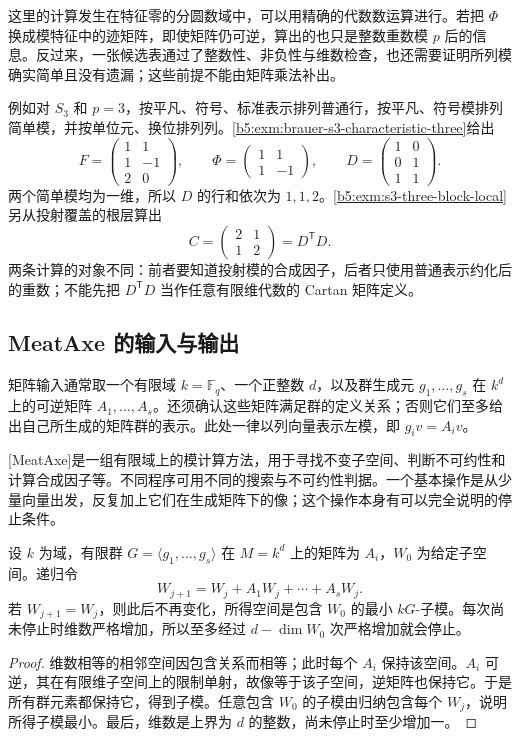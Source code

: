 这里的计算发生在特征零的分圆数域中，可以用精确的代数数运算进行。若把 \(\Phi\) 换成模特征中的迹矩阵，即使矩阵仍可逆，算出的也只是整数重数模 \(p\) 后的信息。反过来，一张候选表通过了整数性、非负性与维数检查，也还需要证明所列模确实简单且没有遗漏；这些前提不能由矩阵乘法补出。

\ProseParagraphBreak
例如对 \(S_3\) 和 \(p=3\)，按平凡、符号、标准表示排列普通行，按平凡、符号模排列简单模，并按单位元、换位排列列。\cref{b5:exm:brauer-s3-characteristic-three}给出
\[
	F=\begin{pmatrix}1&1\\1&-1\\2&0\end{pmatrix},
	\qquad
	\Phi=\begin{pmatrix}1&1\\1&-1\end{pmatrix},
	\qquad
	D=\begin{pmatrix}1&0\\0&1\\1&1\end{pmatrix}.
\]
两个简单模均为一维，所以 \(D\) 的行和依次为 \(1,1,2\)。\cref{b5:exm:s3-three-block-local}另从投射覆盖的根层算出
\[
	C=\begin{pmatrix}2&1\\1&2\end{pmatrix}=D^{\mathsf T}D.
\]
两条计算的对象不同：前者要知道投射模的合成因子，后者只使用普通表示约化后的重数；不能先把 \(D^{\mathsf T}D\) 当作任意有限维代数的 Cartan 矩阵定义。

\subsection{MeatAxe 的输入与输出}
\label{b5:subsec:0807:02}

矩阵输入通常取一个有限域 \(k=\mathbb F_q\)、一个正整数 \(d\)，以及群生成元 \(g_1,\ldots,g_s\) 在 \(k^d\) 上的可逆矩阵 \(A_1,\ldots,A_s\)。还须确认这些矩阵满足群的定义关系；否则它们至多给出自己所生成的矩阵群的表示。此处一律以列向量表示左模，即 \(g_iv=A_iv\)。

\ProseParagraphBreak
{}[MeatAxe]是一组有限域上的模计算方法，用于寻找不变子空间、判断不可约性和计算合成因子等。不同程序可用不同的搜索与不可约性判据。一个基本操作是从少量向量出发，反复加上它们在生成矩阵下的像；这个操作本身有可以完全说明的停止条件。

\begin{proposition}\label{b5:prop:module-spin-up}
	设 \(k\) 为域，有限群 \(G=\langle g_1,\ldots,g_s\rangle\) 在 \(M=k^d\) 上的矩阵为 \(A_i\)，\(W_0\) 为给定子空间。递归令
	\[
		W_{j+1}=W_j+A_1W_j+\cdots+A_sW_j.
	\]
	若 \(W_{j+1}=W_j\)，则此后不再变化，所得空间是包含 \(W_0\) 的最小 \(kG\)-子模。每次尚未停止时维数严格增加，所以至多经过 \(d-\dim W_0\) 次严格增加就会停止。
\end{proposition}
\begin{proof}
	维数相等的相邻空间因包含关系而相等；此时每个 \(A_i\) 保持该空间。\(A_i\) 可逆，其在有限维子空间上的限制单射，故像等于该子空间，逆矩阵也保持它。于是所有群元素都保持它，得到子模。任意包含 \(W_0\) 的子模由归纳包含每个 \(W_j\)，说明所得子模最小。最后，维数是上界为 \(d\) 的整数，尚未停止时至少增加一。
\end{proof}

